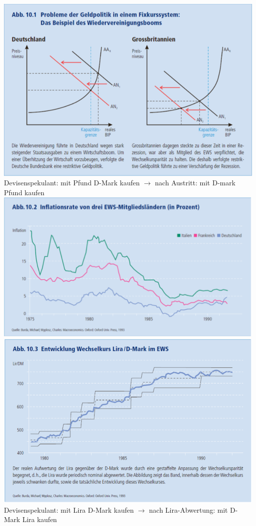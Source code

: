 \begin{multicols}{2}
	\includegraphics[width=\linewidth]{images/fixkurs.png}
	Devisenspekulant: mit Pfund D-Mark kaufen $\rightarrow$ nach Austritt: mit D-mark Pfund kaufen
	\vfill\null
	\columnbreak
	\includegraphics[width=0.7\linewidth]{images/inflationskonvergenz.png}
	\includegraphics[width=0.7\linewidth]{images/inflationskonvergenz2.png}
	Devisenspekulant: mit Lira D-Mark kaufen $\rightarrow$ nach Lira-Abwertung: mit D-Mark Lira kaufen
\end{multicols}

